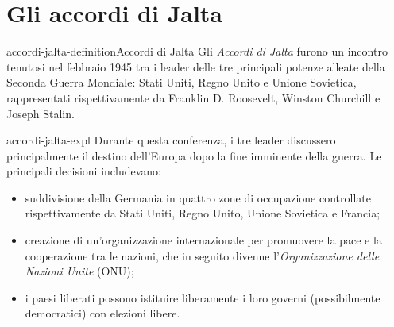 \documentclass[preview]{standalone}
\begin{document}
\genpage

\section{Gli accordi di Jalta}

\begin{snippetdefinition}{accordi-jalta-definition}{Accordi di Jalta}
    Gli \textit{Accordi di Jalta} furono un incontro tenutosi nel febbraio 1945 tra i leader delle tre principali potenze alleate della Seconda Guerra Mondiale: Stati Uniti, Regno Unito e Unione Sovietica, rappresentati rispettivamente da Franklin D. Roosevelt, Winston Churchill e Joseph Stalin.
\end{snippetdefinition}

\begin{snippet}{accordi-jalta-expl}
    Durante questa conferenza, i tre leader discussero principalmente il destino dell'Europa dopo la fine imminente della guerra. Le principali decisioni includevano:

    \begin{itemize}
        \item suddivisione della Germania in quattro zone di occupazione controllate rispettivamente
            da Stati Uniti, Regno Unito, Unione Sovietica e Francia;
        \item creazione di un'organizzazione internazionale per promuovere la pace e la cooperazione tra le nazioni, che in seguito divenne l'\textit{Organizzazione delle Nazioni Unite} (ONU);
        \item i paesi liberati possono istituire liberamente i loro governi (possibilmente democratici) con elezioni libere.
    \end{itemize}
\end{snippet}
\end{document}
